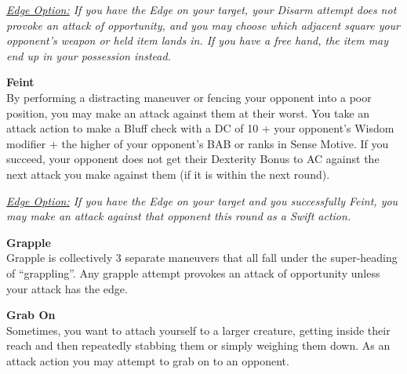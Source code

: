 

\smallskip\emph{\underline{Edge Option:} If you have the Edge on your target, your Disarm attempt does not provoke an attack of opportunity, and you may choose which adjacent square your opponent's weapon or held item lands in. If you have a free hand, the item may end up in your possession instead.}\\

\hypertarget{combat:feint}{}
\normalsize\item\textbf{{Feint}}\\\small
By performing a distracting maneuver or fencing your opponent into a poor position, you may make an attack against them at their worst. You take an attack action to make a Bluff check with a DC of 10 + your opponent's Wisdom modifier + the higher of your opponent's BAB or ranks in Sense Motive. If you succeed, your opponent does not get their Dexterity Bonus to AC against the next attack you make against them (if it is within the next round).

\smallskip\emph{\underline{Edge Option:} If you have the Edge on your target and you successfully Feint, you may make an attack against that opponent this round as a Swift action.}\\

\hypertarget{combat:grapple}{}
\normalsize\item\textbf{{Grapple}}\\\small
Grapple is collectively 3 separate maneuvers that all fall under the super-heading of ``grappling''. Any grapple attempt provokes an attack of opportunity unless your attack has the edge.

\listtwo\hypertarget{combat:grabon}{}
      \normalsize\item\textbf{{Grab On}}\\\small
      Sometimes, you want to attach yourself to a larger creature, getting inside their reach and then repeatedly stabbing them or simply weighing them down.  As an attack action you may attempt to grab on to an opponent.

